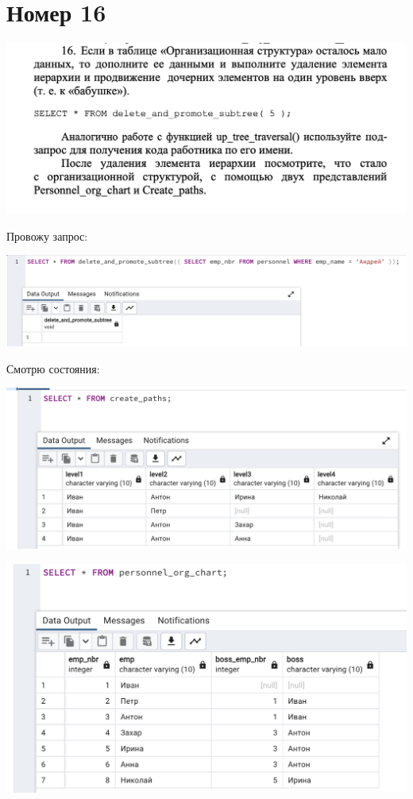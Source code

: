 \documentclass[a4paper,12pt]{article}
\begin{document}
\section*{Номер 16}
\begin{flushleft}
\includegraphics[scale=0.5]{16_1.png}
\end{flushleft}
Провожу запрос:
\begin{flushleft}
\includegraphics[scale=0.5]{16_2.png}
\end{flushleft}
Смотрю состояния:
\begin{flushleft}
\includegraphics[scale=0.5]{16_3.png}
\end{flushleft}
\begin{flushleft}
\includegraphics[scale=0.5]{16_4.png}
\end{flushleft}
\clearpage
\end{document}

